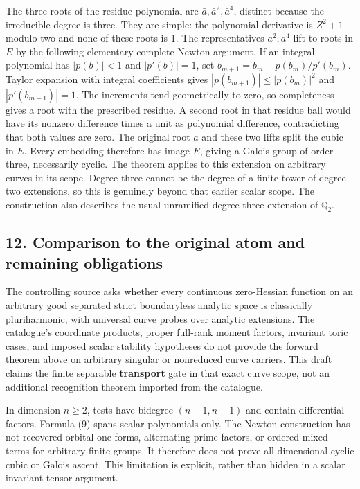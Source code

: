 \documentclass[11pt]{article}
\begin{document}
The three roots of the residue polynomial are
\(\bar a,\bar a^2,\bar a^4\), distinct because the irreducible degree is
three. They are simple: the polynomial derivative is \(Z^2+1\) modulo
two and none of these roots is 1. The representatives \(a^2,a^4\) lift
to roots in \(E\) by the following elementary complete Newton argument.
If an integral polynomial has \(|p(b)|<1\) and \(|p'(b)|=1\), set
\(b_{m+1}=b_m-p(b_m)/p'(b_m)\). Taylor expansion with integral
coefficients gives \(|p(b_{m+1})|\le|p(b_m)|^2\) and
\(|p'(b_{m+1})|=1\). The increments tend geometrically to zero, so
completeness gives a root with the prescribed residue. A second root in
that residue ball would have its nonzero difference times a unit as
polynomial difference, contradicting that both values are zero. The
original root \(a\) and these two lifts split the cubic in \(E\). Every
embedding therefore has image \(E\), giving a Galois group of order
three, necessarily cyclic. The theorem applies to this extension on
arbitrary curves in its scope. Degree three cannot be the degree of a
finite tower of degree-two extensions, so this is genuinely beyond that
earlier scalar scope. The construction also describes the usual
unramified degree-three extension of \(\mathbb Q_2\).

\subsection{12. Comparison to the original atom and remaining
obligations}\label{comparison-to-the-original-atom-and-remaining-obligations}

The controlling source asks whether every continuous zero-Hessian
function on an arbitrary good separated strict boundaryless analytic
space is classically pluriharmonic, with universal curve probes over
analytic extensions. The catalogue's coordinate products, proper
full-rank moment factors, invariant toric cases, and imposed scalar
stability hypotheses do not provide the forward theorem above on
arbitrary singular or nonreduced curve carriers. This draft claims the
finite separable \textbf{transport} gate in that exact curve scope, not
an additional recognition theorem imported from the catalogue.

In dimension \(n\ge2\), tests have bidegree \((n-1,n-1)\) and contain
differential factors. Formula (9) spans scalar polynomials only. The
Newton construction has not recovered orbital one-forms, alternating
prime factors, or ordered mixed terms for arbitrary finite groups. It
therefore does not prove all-dimensional cyclic cubic or Galois ascent.
This limitation is explicit, rather than hidden in a scalar
invariant-tensor argument.
\end{document}
